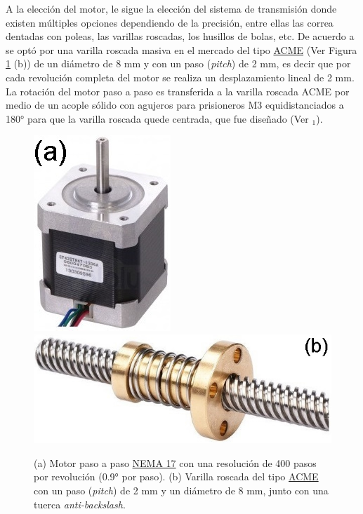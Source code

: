 A la elección del motor, le sigue la elección del sistema de transmisión donde existen múltiples opciones dependiendo de la precisión, entre ellas las correa dentadas con poleas, las varillas roscadas, los husillos de bolas, etc. De acuerdo a \cite{schaa} se optó por una varilla roscada masiva en el mercado del tipo \href{https://www.mcmaster.com/acme-screws/acme-lead-screws-and-nuts/}{ACME} (Ver Figura \ref{fig:acm} (b)) de un diámetro de 8 mm y con un paso (\textit{pitch}) de 2 mm, es decir que por cada revolución completa del motor se realiza un desplazamiento lineal de 2 mm. La rotación del motor paso a paso es transferida a la varilla roscada ACME por medio de un acople sólido con agujeros para prisioneros M3 equidistanciados a 180° para que la varilla roscada quede centrada, que fue diseñado (Ver \href{https://github.com/jrr1984/open\_frame\_XYStage/blob/master/3dprintedparts/STLs/acopleRIGIDO.STL}{\faCubes$_{1}$}).
\begin{figure}[H]
\hfill%
\includegraphics[scale=0.7]{Figs/microespectrometro/nema17.jpg}
\hfill%
\includegraphics[scale=0.7]{Figs/microespectrometro/acmeantib.jpg}
\hfill%
\hfill%
\caption{(a) Motor paso a paso \href{https://www.pololu.com/product/1200}{NEMA 17} con una resolución de 400 pasos por revolución (0.9° por paso). (b) Varilla roscada del tipo \href{https://www.mcmaster.com/acme-screws/acme-lead-screws-and-nuts/}{ACME} con un paso (\textit{pitch}) de 2 mm  y un diámetro de 8 mm, junto con una tuerca \textit{anti-backslash}.}
\label{fig:acm}
\end{figure}

